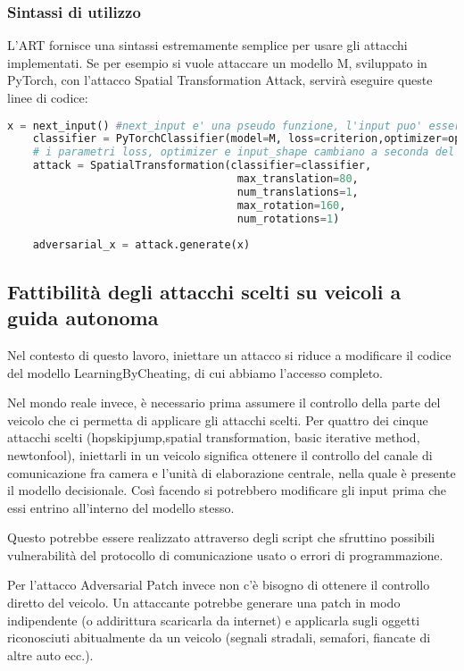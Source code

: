 \subsubsection{Sintassi di utilizzo}
L'ART fornisce una sintassi estremamente semplice per usare gli attacchi implementati. Se per esempio si vuole attaccare un modello M, sviluppato in PyTorch, con l'attacco Spatial
Transformation Attack, servirà eseguire queste linee di codice:\begin{lstlisting}[language=Python]
    x = next_input() #next_input e' una pseudo funzione, l'input puo' essere ottenuto in vari modi
    classifier = PyTorchClassifier(model=M, loss=criterion,optimizer=optimizer, input_shape=(3, 160, 384)) 
    # i parametri loss, optimizer e input_shape cambiano a seconda del modello
    attack = SpatialTransformation(classifier=classifier,
                                    max_translation=80,
                                    num_translations=1,
                                    max_rotation=160,
                                    num_rotations=1)
    
    adversarial_x = attack.generate(x)
\end{lstlisting}

\subsection{Fattibilità degli attacchi scelti su veicoli a guida autonoma}
Nel contesto di questo lavoro, iniettare un attacco si riduce a modificare il codice del modello LearningByCheating, di cui abbiamo l'accesso completo. 

Nel  mondo reale invece, è necessario prima assumere il controllo della parte del  veicolo che ci permetta di applicare gli attacchi scelti.
Per quattro dei cinque attacchi scelti (hopskipjump,spatial transformation, basic iterative method, newtonfool), iniettarli in un veicolo significa ottenere il controllo del canale
di comunicazione fra camera e l'unità di elaborazione centrale, nella quale è presente il modello decisionale. Così facendo si potrebbero  modificare gli input prima che essi entrino
all'interno del modello stesso.

Questo potrebbe essere realizzato attraverso degli script che sfruttino possibili vulnerabilità del protocollo di comunicazione usato o errori di programmazione.

Per l'attacco Adversarial Patch invece non c'è bisogno  di ottenere il controllo diretto del veicolo. Un attaccante potrebbe generare
una patch in modo indipendente (o addirittura scaricarla da internet) e applicarla sugli oggetti riconosciuti abitualmente da un veicolo (segnali stradali, semafori, fiancate di altre auto ecc.).
